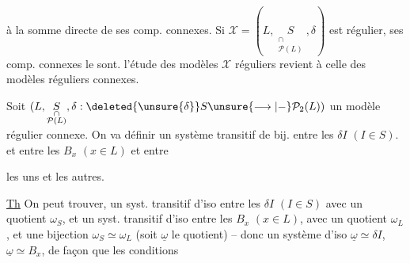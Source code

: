 
à la somme directe de ses comp. connexes. Si $\mathcal X=(L,\underset{\substack{\cap\\\mathcal P(L)}}{S},\delta)$ est régulier,  ses comp. connexes le sont.  l'étude des modèles $\mathcal X$ réguliers  revient à celle des modèles réguliers connexes.

Soit $(L,\underset{\substack{\cap\\\mathcal P(L)}}{S},\delta:\deleted{\unsure{\delta}}S\unsure{\longrightarrow|-}\mathcal P_2(L))$ un modèle régulier connexe. On va définir un système transitif de bij. entre les $\delta I$ $(I\in S)$. et entre les $B_x$ $(x\in L)$ et entre


les uns et les autres. 


\uline{Th} On peut trouver,  un syst. transitif d'iso entre les $\delta I$ $(I\in S)$ avec un quotient $\omega_S$, et un syst. transitif d'iso entre les $B_x$ $(x\in L)$, avec un quotient $\omega_L$, et une bijection $\omega_S\simeq\omega_L$ (soit $\underline{\omega}$ le quotient) -- donc un système d'iso $\underline{\omega}\simeq\delta I$, $\underline{\omega}\simeq B_x$, de façon que les conditions


